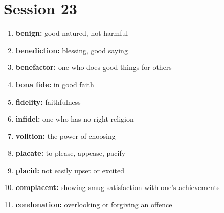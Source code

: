\documentclass{article}
\begin{document}
\section{Session 23}
\begin{enumerate}
    \item \textbf{benign: }{good-natured, not harmful}
    \item \textbf{benediction: }{blessing, good saying}
    \item \textbf{benefactor: }{one who does good things for others}
    \item \textbf{bona fide: }{in good faith}
    \item \textbf{fidelity: }{faithfulness}
    \item \textbf{infidel: }{one who has no right religion}
    \item \textbf{volition: }{the power of choosing}
    \item \textbf{placate: }{to please, appease, pacify}
    \item \textbf{placid: }{not easily upset or excited}
    \item \textbf{complacent: }{showing smug satisfaction with one's achievements}
    \item \textbf{condonation: }{overlooking or forgiving an offence}
    
\end{enumerate}
\end{document}
